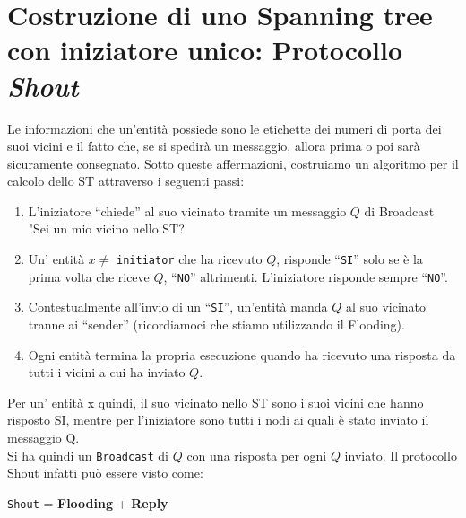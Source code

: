 \section{Costruzione di uno Spanning tree con iniziatore unico: Protocollo \textit{Shout}}
Le informazioni che un'entità possiede sono le etichette dei numeri di porta dei suoi vicini e il fatto che, se si spedirà un messaggio, allora prima o poi sarà sicuramente consegnato. Sotto queste affermazioni, costruiamo un algoritmo per il calcolo dello ST attraverso i seguenti passi:

\begin{enumerate}
  \item L'iniziatore ``chiede'' al suo vicinato tramite un messaggio $Q$ di Broadcast "Sei un mio vicino nello ST?
  \item Un' entità $x \neq $ \texttt{initiator} che ha ricevuto $Q$, risponde ``\texttt{SI}'' solo se è la prima volta che riceve $Q$, ``\texttt{NO}'' altrimenti. L'iniziatore risponde sempre ``\texttt{NO}''.
  \item Contestualmente all'invio di un ``\texttt{SI}'', un'entità manda $Q$ al suo vicinato tranne ai ``sender'' (ricordiamoci che stiamo utilizzando il Flooding).
  \item Ogni entità termina la propria esecuzione quando ha ricevuto una risposta da tutti i vicini a cui ha inviato $Q$.
\end{enumerate}
Per un' entità x quindi, il suo vicinato nello ST sono i suoi vicini che hanno risposto SI, mentre per l'iniziatore sono tutti i nodi ai quali è stato inviato il messaggio Q.\\
Si ha quindi un \texttt{Broadcast} di $Q$ con una risposta per ogni $Q$ inviato. Il protocollo Shout infatti può essere visto come:

\begin{center}
  \texttt{Shout} = \textbf{Flooding} + \textbf{Reply}
\end{center}

